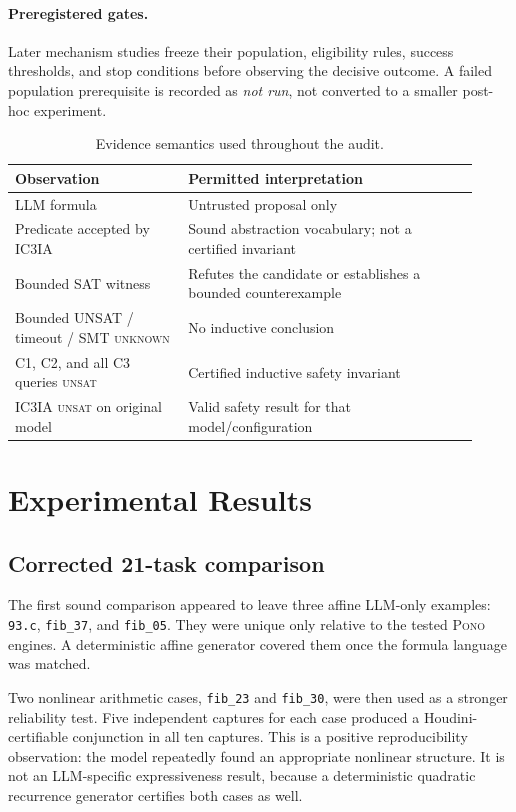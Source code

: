 \documentclass[10pt]{article}
\newcommand{\pono}{\textsc{Pono}}
\newcommand{\code}[1]{\texttt{#1}}
\newcommand{\unsat}{\textsc{unsat}}
\newcommand{\unknown}{\textsc{unknown}}
\begin{document}
\paragraph{Preregistered gates.}
Later mechanism studies freeze their population, eligibility rules, success
thresholds, and stop conditions before observing the decisive outcome.  A
failed population prerequisite is recorded as \emph{not run}, not converted to
a smaller post-hoc experiment.

\begin{table}[t]
\centering
\caption{Evidence semantics used throughout the audit.}
\label{tab:evidence}
\small
\begin{tabular}{p{0.34\linewidth}p{0.58\linewidth}}
\toprule
Observation & Permitted interpretation \\
\midrule
LLM formula & Untrusted proposal only \\
Predicate accepted by IC3IA & Sound abstraction vocabulary; not a certified invariant \\
Bounded SAT witness & Refutes the candidate or establishes a bounded counterexample \\
Bounded UNSAT / timeout / SMT \unknown{} & No inductive conclusion \\
C1, C2, and all C3 queries \unsat{} & Certified inductive safety invariant \\
IC3IA \unsat{} on original model & Valid safety result for that model/configuration \\
\bottomrule
\end{tabular}
\end{table}

\section{Experimental Results}
\label{sec:results}

\subsection{Corrected 21-task comparison}

The first sound comparison appeared to leave three affine LLM-only examples:
\code{93.c}, \code{fib\_37}, and \code{fib\_05}.  They were unique only
relative to the tested \pono{} engines.  A deterministic affine generator
covered them once the formula language was matched.

Two nonlinear arithmetic cases, \code{fib\_23} and \code{fib\_30}, were then
used as a stronger reliability test.  Five independent captures for each case
produced a Houdini-certifiable conjunction in all ten captures.  This is a
positive reproducibility observation: the model repeatedly found an
appropriate nonlinear structure.  It is not an LLM-specific expressiveness
result, because a deterministic quadratic recurrence generator certifies both
cases as well.
\end{document}
